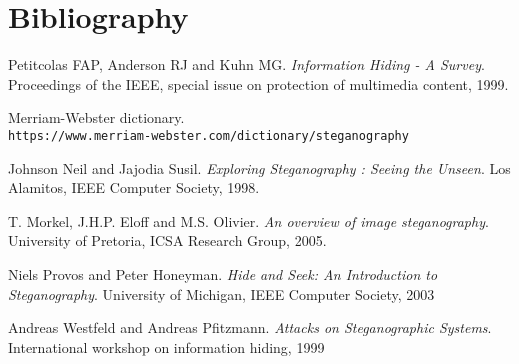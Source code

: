 \documentclass[notitlepage]{report}
\begin{document}
\chapter{Bibliography}
\begin{thebibliography}{9}
Petitcolas FAP, Anderson RJ and Kuhn MG.
\textit{Information Hiding - A Survey}.
Proceedings of the IEEE, special issue on protection of multimedia content, 1999.

Merriam-Webster dictionary.
\\\texttt{https://www.merriam-webster.com/dictionary/steganography}

Johnson Neil and Jajodia Susil.
\textit{Exploring Steganography : Seeing the Unseen}. 
Los Alamitos, IEEE Computer Society, 1998.

%
T. Morkel, J.H.P. Eloff and M.S. Olivier. 
\textit{An overview of image steganography}.
University of Pretoria, ICSA Research Group, 2005.

Niels Provos and Peter Honeyman.
\textit{Hide and Seek: An Introduction to Steganography}.
University of Michigan, IEEE Computer Society, 2003

Andreas Westfeld and Andreas Pfitzmann.
\textit{Attacks on Steganographic Systems}.
International workshop on information hiding, 1999
\end{thebibliography}
\end{document}
